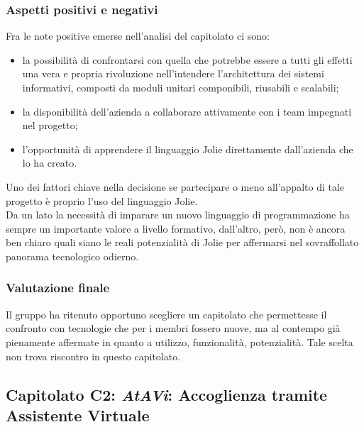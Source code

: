 		\subsubsection{Aspetti positivi e negativi}
		Fra le note positive emerse nell'analisi del capitolato ci sono:
		\begin{itemize}
			\item la possibilità di confrontarsi con quella che potrebbe essere a tutti gli effetti una vera e propria rivoluzione nell'intendere 
			l'architettura dei sistemi informativi, composti da moduli unitari componibili, riusabili e scalabili;
			\item la disponibilità dell'azienda a collaborare attivamente con i team impegnati nel progetto;
			\item l'opportunità di apprendere il linguaggio Jolie direttamente dall'azienda che lo ha creato.
		\end{itemize}
		Uno dei fattori chiave nella decisione se partecipare o meno all'appalto di tale progetto è proprio l'uso del linguaggio Jolie.
		\\Da un lato la necessità di imparare un nuovo linguaggio di programmazione ha sempre un importante valore a livello formativo, dall'altro, 
		però, non è ancora ben chiaro quali siano le reali potenzialità di Jolie per affermarsi nel sovraffollato panorama tecnologico odierno.
		\subsubsection{Valutazione finale}
		Il gruppo \hx{} ha ritenuto opportuno scegliere un capitolato che permettesse il confronto con tecnologie che per i membri fossero nuove,
		ma al contempo già pienamente affermate in quanto a utilizzo, funzionalità, potenzialità. Tale scelta non trova riscontro in questo capitolato.
		
	\subsection{Capitolato C2: \emph{AtAVi}: Accoglienza tramite Assistente Virtuale}
